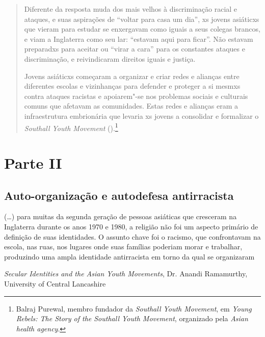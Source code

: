\begin{quote}
Diferente da resposta muda dos mais velhos à discriminação racial e ataques, e suas aspirações de ``voltar para casa um dia'', xs jovens asiáticxs que vieram para estudar se enxergavam como iguais a seus colegas brancos, e viam a Inglaterra como seu lar: ``estavam aqui para ficar''. Não estavam preparadxs para aceitar ou ``virar a cara'' para os constantes ataques e discriminação, e reivindicaram direitos iguais e justiça.

Jovens asiáticxs começaram a organizar e criar redes e alianças entre diferentes escolas e vizinhanças para defender e proteger a si mesmxs contra ataques racistas e apoiarem"-se nos problemas sociais e culturais comuns que afetavam as comunidades. Estas redes e alianças eram a infraestrutura embrionária que levaria xs jovens a consolidar e formalizar o \emph{Southall Youth Movement} ().\footnote{Balraj Purewal, membro fundador da \emph{Southall Youth Movement}, em \emph{Young Rebels: The Story of the Southall Youth Movement}, organizado pela \emph{Asian health agency}.}
\end{quote}



\section{Parte II}

\subsection{Auto-organização e autodefesa antirracista}

\epigraph{(\ldots{}) para muitas da segunda geração de pessoas asiáticas que cresceram na Inglaterra durante os anos 1970 e 1980, a religião não foi um aspecto primário de definição de suas identidades. O assunto chave foi o racismo, que confrontavam na escola, nas ruas, nos lugares onde suas famílias poderiam morar e trabalhar, produzindo uma ampla identidade antirracista em torno da qual se organizaram}{\textit{Secular Identities and the Asian Youth Movements}, Dr. Anandi Ramamurthy, University of Central Lancashire}

